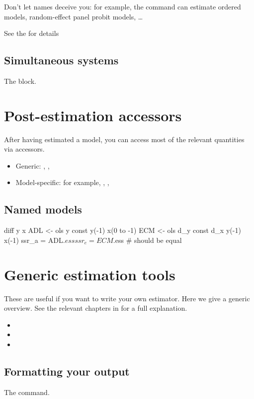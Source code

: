 Don't let names deceive you: for example, the  command can
estimate ordered models, random-effect panel probit models, \ldots

See the \GCR{} for details

\subsection{Simultaneous systems}

The  block.

\section{Post-estimation accessors}
\label{sec:postest-accessors}

After having estimated a model, you can access most of the relevant
quantities via accessors.

\begin{itemize}
\item Generic: , , 
\item Model-specific: for example, , ,
\end{itemize}

\subsection{Named models}

\begin{code}
diff y x
ADL <- ols y const y(-1) x(0 to -1)
ECM <- ols d_y const d_x y(-1) x(-1)
ssr_a = ADL.$ess
ssr_e = ECM.$ess # should be equal
\end{code}

\section{Generic estimation tools}
\label{sec:est-blocks}

These are useful if you want to write your own estimator. Here we give
a generic overview. See the relevant chapters in \GUG{} for a full explanation.

\begin{itemize}
\item {}
\item {}
\item {}
\end{itemize}

\subsection{Formatting your output}

The  command.

